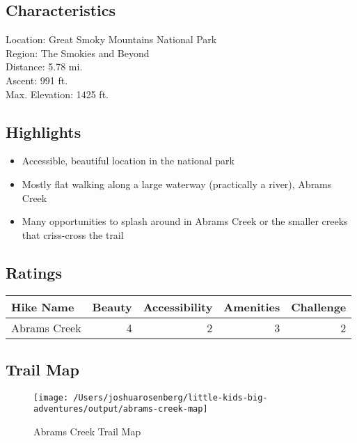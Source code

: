 \documentclass[
]{book}
\providecommand{\tightlist}{%
  \setlength{\itemsep}{0pt}\setlength{\parskip}{0pt}}
\begin{document}
\hypertarget{characteristics}{%
\subsection{Characteristics}\label{characteristics}}

Location: Great Smoky Mountains National Park\\
Region: The Smokies and Beyond\\
Distance: 5.78 mi.\\
Ascent: 991 ft.\\
Max. Elevation: 1425 ft.

\hypertarget{highlights}{%
\subsection{Highlights}\label{highlights}}

\begin{itemize}
\tightlist
\item
  Accessible, beautiful location in the national park
\item
  Mostly flat walking along a large waterway (practically a river), Abrams Creek
\item
  Many opportunities to splash around in Abrams Creek or the smaller creeks that criss-cross the trail
\end{itemize}

\hypertarget{ratings-8}{%
\subsection{Ratings}\label{ratings-8}}

\begin{table}
\centering
\begin{tabular}[t]{l|r|r|r|r}
\hline
Hike Name & Beauty & Accessibility & Amenities & Challenge\\
\hline
Abrams Creek & 4 & 2 & 3 & 2\\
\hline
\end{tabular}
\end{table}

\hypertarget{trail-map}{%
\subsection{Trail Map}\label{trail-map}}

\begin{figure}
\texttt{[image: /Users/joshuarosenberg/little-kids-big-adventures/output/abrams-creek-map]} \caption{Abrams Creek Trail Map}\label{fig:unnamed-chunk-36}
\end{figure}
\end{document}
